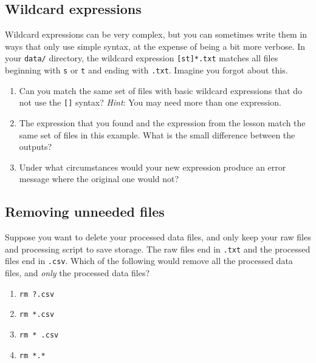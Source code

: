 \documentclass[
]{krantz}
\providecommand{\tightlist}{%
  \setlength{\itemsep}{0pt}\setlength{\parskip}{0pt}}
\begin{document}
\hypertarget{bash-basics-ex-wildcard-expressions}{%
\subsection{Wildcard expressions}\label{bash-basics-ex-wildcard-expressions}}

Wildcard expressions can be very complex, but you can sometimes write
them in ways that only use simple syntax, at the expense of being a bit
more verbose.
In your \texttt{data/} directory,
the wildcard expression \texttt{{[}st{]}*.txt}
matches all files beginning with \texttt{s} or \texttt{t} and ending with \texttt{.txt}.
Imagine you forgot about this.

\begin{enumerate}
\def\labelenumi{\arabic{enumi}.}
\item
  Can you match the same set of files with basic wildcard expressions
  that do not use the \texttt{{[}{]}} syntax? \emph{Hint}: You may need more than one
  expression.
\item
  The expression that you found and the expression from the lesson match the
  same set of files in this example. What is the small difference between the
  outputs?
\item
  Under what circumstances would your new expression produce an error message
  where the original one would not?
\end{enumerate}

\hypertarget{bash-basics-ex-remove-unneeded}{%
\subsection{Removing unneeded files}\label{bash-basics-ex-remove-unneeded}}

Suppose you want to delete your processed data files, and only keep
your raw files and processing script to save storage.
The raw files end in \texttt{.txt} and the processed files end in \texttt{.csv}.
Which of the following would remove all the processed data files,
and \emph{only} the processed data files?

\begin{enumerate}
\def\labelenumi{\arabic{enumi}.}
\tightlist
\item
  \texttt{rm\ ?.csv}
\item
  \texttt{rm\ *.csv}
\item
  \texttt{rm\ *\ .csv}
\item
  \texttt{rm\ *.*}
\end{enumerate}
\end{document}
